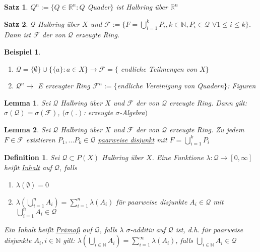 \documentclass[11pt]{memoir}
\theoremstyle{break}
\newtheorem{Definition}{Definition}[chapter]
\newtheorem{Beispiel}{Beispiel}[chapter]
\newtheorem{Lemma}{Lemma}[chapter]
\newtheorem{Satz}{Satz}[chapter]
\begin{document}
\begin{Satz}
$Q^n := \{Q \in \mathbb R^n: Q $ Quader$\}$ ist Halbring über $\mathbb R^n$
\end{Satz}

\begin{Satz}
$\mathscr Q$ Halbring über $X$ und $\mathscr F := \{F = \bigcup\limits_{i=1}^k P_i, k \in \mathbb N, P_i \in \mathscr Q$ $\forall 1 \leq i \leq k\}$. Dann ist $\mathscr F$ der von $\mathscr Q$ erzeugte Ring.
\end{Satz}

\begin{Beispiel}
\begin{enumerate}
	\item $\mathscr Q = \{\emptyset \} \cup \{\{a\}: a \in X\} \rightarrow \mathscr F = \{$ endliche Teilmengen von $X\}$
	\item $\mathscr Q^n \rightarrow$ E erzeugter Ring $\mathscr F^n:= \{$endliche Vereinigung von Quadern$\}$: Figuren
\end{enumerate}
\end{Beispiel}

\begin{Lemma}
Sei $\mathscr Q$ Halbring über $X$ und $\mathscr F$ der von $\mathscr Q$ erzeugte Ring. Dann gilt: $\sigma(\mathscr Q) = \sigma(\mathscr F)$, $(\sigma(.)$: erzeugte $\sigma$-Algebra$)$
\end{Lemma}

\begin{Lemma}
Sei $\mathscr Q$ Halbring über $X$ und $\mathscr F$ der von $\mathscr Q$ erzeugte Ring. Zu jedem $F \in \mathscr F$ existieren $P_1, ... P_k \in \mathscr Q$ \underline{paarweise disjunkt} mit $F = \bigcup\limits_{i=1}^k P_i$
\end{Lemma}

\begin{Definition}
Sei $\mathscr Q \subset P(X)$ Halbring über $X$. Eine Funktione $\lambda: \mathscr Q \rightarrow [0, \infty ]$ heißt \underline{Inhalt} auf $\mathscr Q$, falls
\begin{enumerate}
	\item $\lambda(\emptyset) = 0$
	\item $\lambda\left(\bigcup\limits_{i=1}^n	A_i\right) = \sum\limits_{i=1}^n \lambda(A_i)$ für paarweise disjunkte $A_i \in \mathscr Q$ mit $\bigcup\limits_{i=1}^n A_i \in \mathscr Q$
\end{enumerate}
Ein Inhalt heißt \underline{Prämaß} auf $\mathscr Q$, falls $\lambda$ $\sigma$-additiv auf $\mathscr Q$ ist, d.h. für paarweise disjunkte $A_i, i \in \mathbb N$ gilt: $\lambda\left(\bigcup\limits_{i\in \mathbb N} A_i \right) = \sum\limits_{i=1}^\infty \lambda(A_i)$, falls $\bigcup\limits_{i \in \mathbb N} A_i \in \mathscr Q$
\end{Definition}
\end{document}
